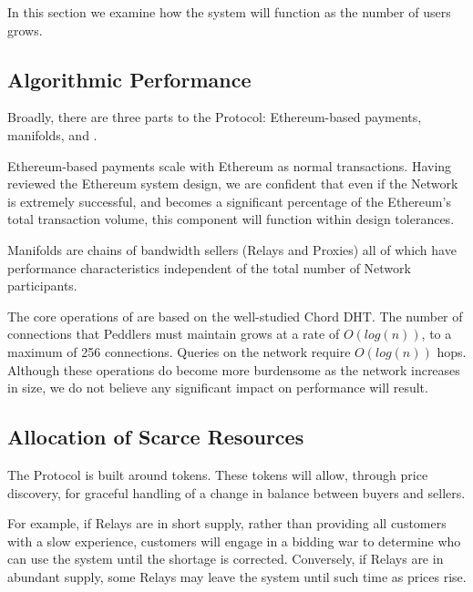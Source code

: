 
In this section we examine how the system will function as the
number of users grows.

\subsection*{Algorithmic Performance}

Broadly, there are three parts to the \Orchid{} Protocol: Ethereum-based
payments, manifolds, and \tOM{}.

Ethereum-based payments scale with Ethereum as normal transactions.
Having reviewed the Ethereum system design, we are confident that even
if the \Orchid{} Network is extremely successful, and becomes a
significant percentage of the Ethereum's total transaction volume,
this component will function within design tolerances.

Manifolds are chains of bandwidth sellers (Relays and Proxies)
all of which have performance characteristics independent of the total number of
\Orchid{} Network participants.

The core operations of \tOM{} are based on the well-studied Chord
DHT. The number of connections that Peddlers must maintain grows at a
rate of $O(log{}(n))$, to a maximum of 256 connections. Queries on the
network require $O(log{}(n))$ hops. Although these operations do become
more burdensome as the network increases in size, we do not believe
any significant impact on performance will result.

\subsection*{Allocation of Scarce Resources}

The \Orchid{} Protocol is built around tokens. These tokens will allow,
through price discovery, for graceful handling of a change in balance
between buyers and sellers.

For example, if Relays are in short supply, rather than providing all
customers with a slow experience, customers will engage in a bidding
war to determine who can use the system until the shortage is
corrected. Conversely, if Relays are in abundant supply, some Relays
may leave the system until such time as prices rise.


